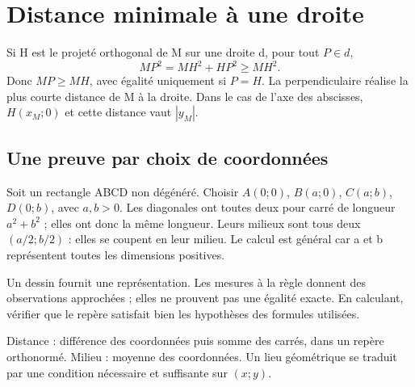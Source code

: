 \documentclass[../cours_2de.tex]{subfiles}
\begin{document}
\section{Distance minimale à une droite}
Si H est le projeté orthogonal de M sur une droite d, pour tout $P\in d$,
\[
MP^2=MH^2+HP^2\ge MH^2.
\]
Donc $MP\ge MH$, avec égalité uniquement si $P=H$. La perpendiculaire réalise la plus courte distance de M à la droite. Dans le cas de l'axe des abscisses, $H(x_M;0)$ et cette distance vaut $|y_M|$.
\begin{finchapitre}
\section{Une preuve par choix de coordonnées}
Soit un rectangle ABCD non dégénéré. Choisir $A(0;0)$, $B(a;0)$, $C(a;b)$, $D(0;b)$, avec $a,b>0$. Les diagonales ont toutes deux pour carré de longueur $a^2+b^2$ ; elles ont donc la même longueur. Leurs milieux sont tous deux $(a/2;b/2)$ : elles se coupent en leur milieu. Le calcul est général car a et b représentent toutes les dimensions positives.
\begin{attention}
Un dessin fournit une représentation. Les mesures à la règle donnent des observations approchées ; elles ne prouvent pas une égalité exacte. En calculant, vérifier que le repère satisfait bien les hypothèses des formules utilisées.
\end{attention}
\begin{retenir}
Distance : différence des coordonnées puis somme des carrés, dans un repère orthonormé. Milieu : moyenne des coordonnées. Un lieu géométrique se traduit par une condition nécessaire et suffisante sur $(x;y)$.
\end{retenir}
\end{finchapitre}
\end{document}
